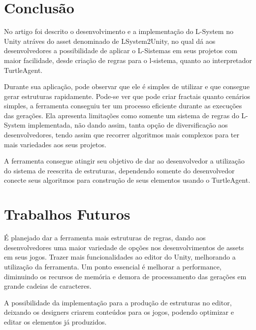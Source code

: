 \section{Conclusão}
No artigo foi descrito o desenvolvimento e a implementação do L-System no Unity atráves do asset denominado de LSystem2Unity, no qual dá aos desenvolvedores a possibilidade de aplicar o L-Sistemas em seus projetos com maior facilidade, desde criação de regras para o l-sistema, quanto ao interpretador TurtleAgent.

Durante sua aplicação, pode observar que ele é simples de utilizar e que consegue gerar estruturas rapidamente. Pode-se ver que pode criar fractais quanto cenários simples, a ferramenta conseguiu ter um processo eficiente durante as execuções das gerações. Ela apresenta limitações como somente um sistema de regras do L-System implementada, não dando assim, tanta opção de diversificação aos desenvolvedores, tendo assim que recorrer algoritmos mais complexos para ter mais variedades aos seus projetos.

A ferramenta consegue atingir seu objetivo de dar ao desenvolvedor a utilização do sistema de reescrita de estruturas, dependendo somente do desenvolvedor conecte seus algoritmos para construção de seus elementos usando o TurtleAgent.

\section{Trabalhos Futuros}
É planejado dar a ferramenta mais estruturas de regras, dando aos desenvolvedores uma maior variedade de opções nos desenvolvimentos de assets em seus jogos. Trazer mais funcionalidades ao editor do Unity, melhorando a utilização da ferramenta. Um ponto essencial é melhorar a performance, diminuindo os recursos de memória e demora de processamento das gerações em grande cadeias de caracteres.

A possibilidade da implementação para a produção de estruturas no editor, deixando os designers criarem conteúdos para os jogos, podendo optimizar e editar os elementos já produzidos.